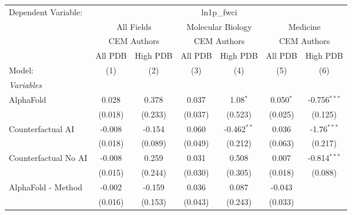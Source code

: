 \begingroup
\centering
\begin{tabular}{lcccccc}
   \tabularnewline \midrule \midrule
   Dependent Variable: & \multicolumn{6}{c}{ln1p\_fwci}\\
 & \multicolumn{2}{c}{All Fields} & \multicolumn{2}{c}{Molecular Biology} & \multicolumn{2}{c}{Medicine} \\
\cmidrule(lr){2-3} \cmidrule(lr){4-5} \cmidrule(lr){6-7}
 & \multicolumn{2}{c}{CEM Authors} & \multicolumn{2}{c}{CEM Authors} & \multicolumn{2}{c}{CEM Authors} \\
\cmidrule(lr){2-3} \cmidrule(lr){4-5} \cmidrule(lr){6-7}
 & \multicolumn{1}{c}{All PDB} & \multicolumn{1}{c}{High PDB} & \multicolumn{1}{c}{All PDB} & \multicolumn{1}{c}{High PDB} & \multicolumn{1}{c}{All PDB} & \multicolumn{1}{c}{High PDB} \\
\cmidrule(lr){2-2} \cmidrule(lr){3-3} \cmidrule(lr){4-4} \cmidrule(lr){5-5} \cmidrule(lr){6-6} \cmidrule(lr){7-7}
   Model:                                                     & (1)         & (2)           & (3)     & (4)           & (5)           & (6)\\  
   \midrule
   \emph{Variables}\\
   AlphaFold                                                  & 0.028       & 0.378         & 0.037   & 1.08$^{*}$    & 0.050$^{*}$   & -0.756$^{***}$\\   
                                                              & (0.018)     & (0.233)       & (0.037) & (0.523)       & (0.025)       & (0.125)\\   
   Counterfactual AI                                          & -0.008      & -0.154        & 0.060   & -0.462$^{**}$ & 0.036         & -1.76$^{***}$\\   
                                                              & (0.018)     & (0.089)       & (0.049) & (0.212)       & (0.063)       & (0.217)\\   
   Counterfactual No AI                                       & -0.008      & 0.259         & 0.031   & 0.508         & 0.007         & -0.814$^{***}$\\   
                                                              & (0.015)     & (0.244)       & (0.030) & (0.305)       & (0.018)       & (0.088)\\   
   AlphaFold - Method                                         & -0.002      & -0.159        & 0.036   & 0.087         & -0.043        &   \\   
                                                              & (0.016)     & (0.153)       & (0.043) & (0.243)       & (0.033)       &   \\   

\end{tabular}
